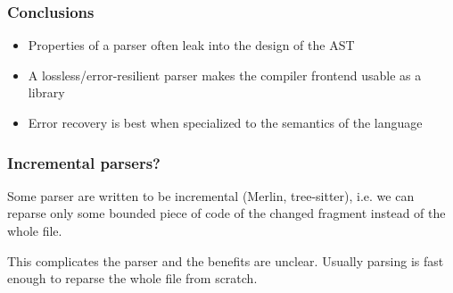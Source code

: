 \documentclass[compress,12pt,xcolor={dvipsnames}]{beamer}
\begin{document}
\begin{frame}
	\frametitle{Conclusions}
	\begin{itemize}
		\item Properties of a parser often leak into the design of the AST
		\item A lossless/error-resilient parser makes the compiler frontend usable as a library
		\item Error recovery is best when specialized to the semantics of the language
	\end{itemize}
\end{frame}

\End
\begin{frame}
	\frametitle{Incremental parsers?}

	Some parser are written to be incremental (Merlin, tree-sitter), i.e. we can reparse only some bounded piece of code of the changed fragment instead of the whole file.

	This complicates the parser and the benefits are unclear. Usually parsing is fast enough to reparse the whole file from scratch.
\end{frame}
\end{document}
